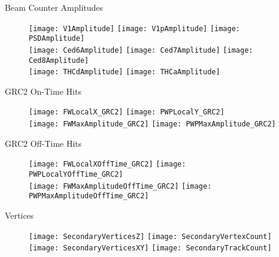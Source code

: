 \documentclass[11pt]{beamer}
\begin{document}
\begin{frame}{Beam Counter Amplitudes}
\begin{figure}
\centering
\texttt{[image: V1Amplitude]} 
\texttt{[image: V1pAmplitude]}
\texttt{[image: PSDAmplitude]} \\
\texttt{[image: Ced6Amplitude]}
\texttt{[image: Ced7Amplitude]} 
\texttt{[image: Ced8Amplitude]} \\
\texttt{[image: THCdAmplitude]} 
\texttt{[image: THCaAmplitude]} 
\end{figure}
\end{frame}

\begin{frame}{GRC2 On-Time Hits}
\begin{figure}
\centering
\texttt{[image: FWLocalX\_GRC2]}
\texttt{[image: PWPLocalY\_GRC2]} \\
\texttt{[image: FWMaxAmplitude\_GRC2]}
\texttt{[image: PWPMaxAmplitude\_GRC2]} \\
\end{figure}
\end{frame}

\begin{frame}{GRC2 Off-Time Hits}
\begin{figure}
\centering
\texttt{[image: FWLocalXOffTime\_GRC2]}
\texttt{[image: PWPLocalYOffTime\_GRC2]} \\
\texttt{[image: FWMaxAmplitudeOffTime\_GRC2]}
\texttt{[image: PWPMaxAmplitudeOffTime\_GRC2]} \\
\end{figure}
\end{frame}

\begin{frame}{Vertices}
\begin{figure}
\centering
\texttt{[image: SecondaryVerticesZ]}
\texttt{[image: SecondaryVertexCount]} \\
\texttt{[image: SecondaryVerticesXY]}
\texttt{[image: SecondaryTrackCount]} \\
\end{figure}
\end{frame}
\end{document}
